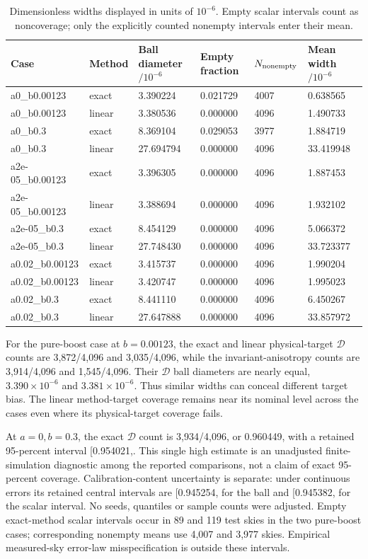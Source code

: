 \documentclass[aps,prd,reprint,onecolumn,nofootinbib]{revtex4-2}
\begin{document}
\begin{table}[htbp]
\centering\small
\caption{Dimensionless widths displayed in units of $10^{-6}$. Empty scalar intervals count as noncoverage; only the explicitly counted nonempty intervals enter their mean.}\label{tab:radwidth}
\begin{tabular}{llllll}
\toprule
Case & Method & Ball diameter $/10^{-6}$ & Empty fraction & $N_{\rm nonempty}$ & Mean width $/10^{-6}$ \\
\midrule
a0\_b0.00123 & exact & 3.390224 & 0.021729 & 4007 & 0.638565 \\
a0\_b0.00123 & linear & 3.380536 & 0.000000 & 4096 & 1.490733 \\
a0\_b0.3 & exact & 8.369104 & 0.029053 & 3977 & 1.884719 \\
a0\_b0.3 & linear & 27.694794 & 0.000000 & 4096 & 33.419948 \\
a2e-05\_b0.00123 & exact & 3.396305 & 0.000000 & 4096 & 1.887453 \\
a2e-05\_b0.00123 & linear & 3.388694 & 0.000000 & 4096 & 1.932102 \\
a2e-05\_b0.3 & exact & 8.454129 & 0.000000 & 4096 & 5.066372 \\
a2e-05\_b0.3 & linear & 27.748430 & 0.000000 & 4096 & 33.723377 \\
a0.02\_b0.00123 & exact & 3.415737 & 0.000000 & 4096 & 1.990204 \\
a0.02\_b0.00123 & linear & 3.420747 & 0.000000 & 4096 & 1.995023 \\
a0.02\_b0.3 & exact & 8.441110 & 0.000000 & 4096 & 6.450267 \\
a0.02\_b0.3 & linear & 27.647888 & 0.000000 & 4096 & 33.857972 \\
\bottomrule
\end{tabular}
\end{table}

For the pure-boost case at \(b=0.00123\), the exact and linear
physical-target \(\mathscr D\) counts are 3,872/4,096 and 3,035/4,096,
while the invariant-anisotropy counts are 3,914/4,096 and 1,545/4,096.
Their \(\mathscr D\) ball diameters are nearly equal,
\(3.390\times10^{-6}\) and \(3.381\times10^{-6}\). Thus similar widths
can conceal different target bias. The linear method-target coverage
remains near its nominal level across the cases even where its
physical-target coverage fails.

At \(a=0,b=0.3\), the exact \(\mathscr D\) count is 3,934/4,096, or
0.960449, with a retained 95-percent interval {[}0.954021,\allowbreak 0.966209{]}.
This single high estimate is an unadjusted finite-simulation diagnostic
among the reported comparisons, not a claim of exact 95-percent
coverage. Calibration-content uncertainty is separate: under continuous
errors its retained central intervals are {[}0.945254,\allowbreak 0.954684{]} for
the ball and {[}0.945382,\allowbreak 0.954801{]} for the scalar interval. No seeds,
quantiles or sample counts were adjusted. Empty exact-method scalar
intervals occur in 89 and 119 test skies in the two pure-boost cases;
corresponding nonempty means use 4,007 and 3,977 skies. Empirical
measured-sky error-law misspecification is outside these intervals.
\end{document}
